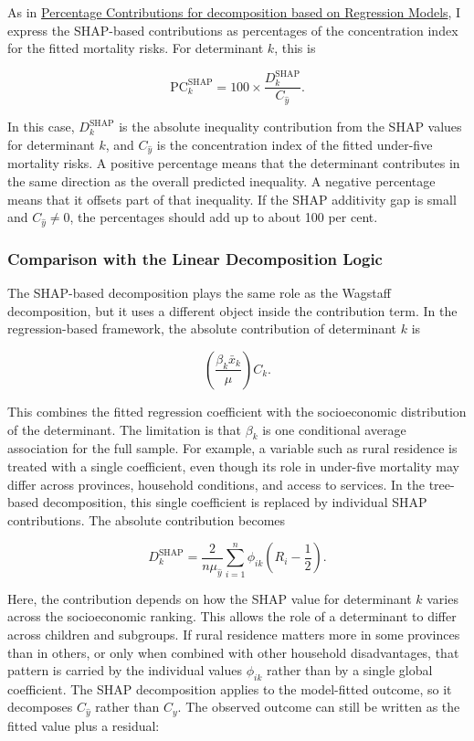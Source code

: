 \documentclass[
  11pt,
  a4paper,
]{article}
\begin{document}
As in \hyperref[sec-percentage-contributions]{Percentage Contributions
for decomposition based on Regression Models}, I express the SHAP-based
contributions as percentages of the concentration index for the fitted
mortality risks. For determinant \(k\), this is

\[
\text{PC}_k^{\text{SHAP}} = 100 \times \frac{D_k^{\text{SHAP}}}{C_{\hat{y}}}.
\]

In this case, \(D_k^{\text{SHAP}}\) is the absolute inequality
contribution from the SHAP values for determinant \(k\), and
\(C_{\hat{y}}\) is the concentration index of the fitted under-five
mortality risks. A positive percentage means that the determinant
contributes in the same direction as the overall predicted inequality. A
negative percentage means that it offsets part of that inequality. If
the SHAP additivity gap is small and \(C_{\hat{y}} \neq 0\), the
percentages should add up to about 100 per cent.

\subsubsection{Comparison with the Linear Decomposition
Logic}\label{sec-linear-decomposition-comparison}

The SHAP-based decomposition plays the same role as the Wagstaff
decomposition, but it uses a different object inside the contribution
term. In the regression-based framework, the absolute contribution of
determinant \(k\) is

\[
\left( \frac{\beta_k \bar{x}_k}{\mu} \right) C_k.
\]

This combines the fitted regression coefficient with the socioeconomic
distribution of the determinant. The limitation is that \(\beta_k\) is
one conditional average association for the full sample. For example, a
variable such as rural residence is treated with a single coefficient,
even though its role in under-five mortality may differ across
provinces, household conditions, and access to services. In the
tree-based decomposition, this single coefficient is replaced by
individual SHAP contributions. The absolute contribution becomes

\[
D_k^{\text{SHAP}}
=
\frac{2}{n\mu_{\hat{y}}}
\sum_{i=1}^n
\phi_{ik}
\left(R_i - \frac{1}{2}\right).
\]

Here, the contribution depends on how the SHAP value for determinant
\(k\) varies across the socioeconomic ranking. This allows the role of a
determinant to differ across children and subgroups. If rural residence
matters more in some provinces than in others, or only when combined
with other household disadvantages, that pattern is carried by the
individual values \(\phi_{ik}\) rather than by a single global
coefficient. The SHAP decomposition applies to the model-fitted outcome,
so it decomposes \(C_{\hat{y}}\) rather than \(C_y\). The observed
outcome can still be written as the fitted value plus a residual:
\end{document}
